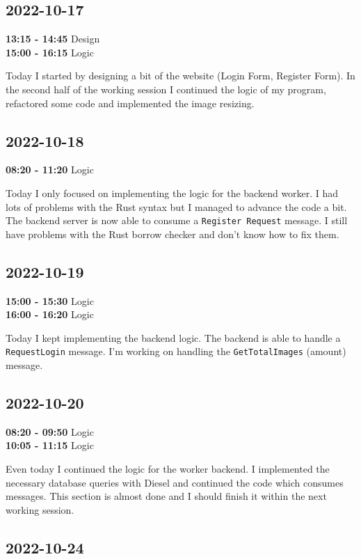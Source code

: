 \documentclass{article}
\begin{document}
\subsection{2022-10-17}

\textbf{13:15 - 14:45} Design \\
\textbf{15:00 - 16:15} Logic

Today I started by designing a bit of the website
(Login Form, Register Form). In the second half of the working session
I continued the logic of my program, refactored some code and
implemented the image resizing.

\subsection{2022-10-18}

\textbf{08:20 - 11:20} Logic

Today I only focused on implementing the logic for the backend
worker. I had lots of problems with the Rust syntax
but I managed to advance the code a bit. The backend server
is now able to consume a \texttt{Register Request} message.
I still have problems with the Rust borrow checker and don't know how to fix them.

\subsection{2022-10-19}

\textbf{15:00 - 15:30} Logic \\
\textbf{16:00 - 16:20} Logic

Today I kept implementing the backend logic. The backend is able to 
handle a \texttt{RequestLogin} message. I'm working on handling
the \texttt{GetTotalImages} (amount) message.

\subsection{2022-10-20}

\textbf{08:20 - 09:50} Logic \\
\textbf{10:05 - 11:15} Logic

Even today I continued the logic for the worker backend.
I implemented the necessary database queries with Diesel
and continued the code which consumes messages.
This section is almost done and I should finish it
within the next working session.

\subsection{2022-10-24}
\end{document}
